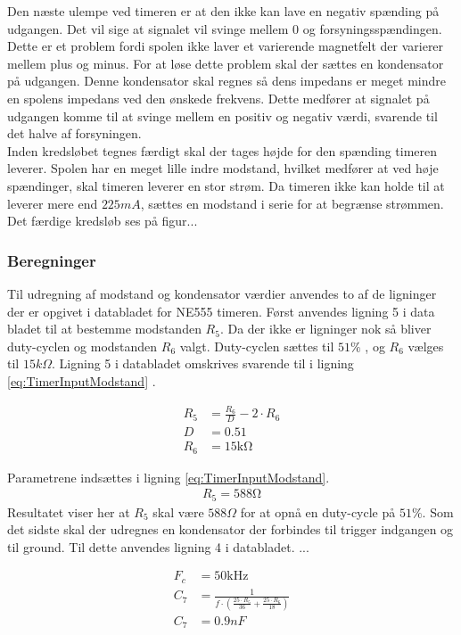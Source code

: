 Den næste ulempe ved timeren er at den ikke kan lave en negativ spænding på udgangen. 
Det vil sige at signalet vil svinge mellem 0 og forsyningsspændingen. 
Dette er et problem fordi spolen ikke laver et varierende magnetfelt der varierer mellem plus og minus. For at løse dette problem skal der sættes en kondensator på udgangen. 
Denne kondensator skal regnes så dens impedans er meget mindre en spolens impedans ved den ønskede frekvens. 
Dette medfører at signalet på udgangen komme til at svinge mellem en positiv og negativ værdi, svarende til det halve af forsyningen.\\

Inden kredsløbet tegnes færdigt skal der tages højde for den spænding timeren leverer. 
Spolen har en meget lille indre modstand, hvilket medfører at ved høje spændinger, skal timeren leverer en stor strøm. 
Da timeren ikke kan holde til at leverer mere end $225 mA$, sættes en modstand i serie for at begrænse strømmen. 
Det færdige kredsløb ses på figur...

\subsubsection{Beregninger}
Til udregning af modstand og kondensator værdier anvendes to af de ligninger der er opgivet i databladet for NE555 timeren. 
Først anvendes ligning 5 i data bladet til at bestemme modstanden $R_5$. 
Da der ikke er ligninger nok så bliver duty-cyclen og modstanden $R_6$ valgt. 
Duty-cyclen sættes til $51 \% $ , og $R_6$ vælges til $15k \Omega $. 
Ligning 5 i databladet omskrives svarende til i ligning \ref{eq:TimerInputModstand} .

\begin{align}
R_5 & = \frac{R_6}{D} - 2 \cdot R_6 \label{eq:TimerInputModstand} \\
D & = 0.51 \nonumber \\
R_6 & = 15 \si{\kilo \ohm} \nonumber
\end{align}

Parametrene indsættes i ligning \ref{eq:TimerInputModstand}.
\begin{align}
R_5 = 588 \si{\ohm} \label{eq:InputBeregnet}
\end{align}
Resultatet viser her at $R_5$ skal være $588 \Omega $ for at opnå en duty-cycle på $51 \% $.
Som det sidste skal der udregnes en kondensator der forbindes til trigger indgangen og til ground. 
Til dette anvendes ligning 4 i databladet. 
... 

\begin{align}
F_c & = 50 \si{\kilo \hertz} \\
C_7 & = \frac{1}{f \cdot \left( \frac{25 \cdot R_5 }{36} + \frac{25 \cdot R_6}{18} \right) } \\
C_7 & = 0.9nF \nonumber
\end{align}

